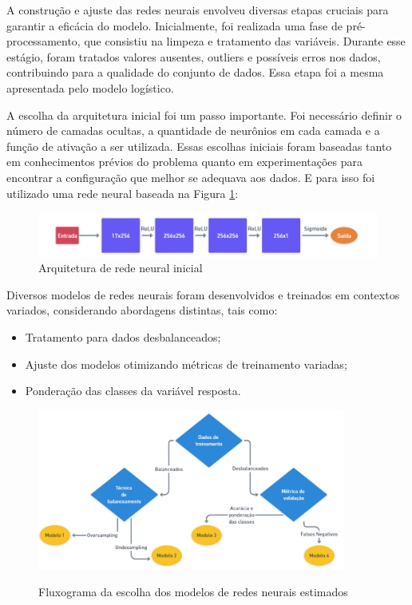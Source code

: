 A  construção e ajuste das redes neurais envolveu diversas etapas cruciais 
para garantir a eficácia do modelo. Inicialmente, foi realizada uma fase de pré-processamento, que consistiu
na limpeza e tratamento das variáveis. Durante esse estágio, foram tratados valores ausentes, outliers e possíveis
erros nos dados, contribuindo para a qualidade do conjunto de dados. Essa etapa foi a mesma apresentada pelo
modelo logístico.

A escolha da arquitetura inicial foi um passo importante. Foi necessário definir o número de camadas ocultas,
a quantidade de neurônios em cada camada e a função de ativação a ser utilizada. Essas escolhas iniciais foram 
baseadas tanto em conhecimentos prévios do problema quanto em experimentações para encontrar a configuração que 
melhor se adequava aos dados. 
E para isso foi utilizado uma rede neural baseada na Figura \ref{fig:imagens/arc_rede_neural.png}:

\begin{figure}[H]
  \centering
  \includegraphics[width=1\textwidth]{imagens/arc_rede_neural.png}
  \caption{Arquitetura de rede neural inicial}
  \label{fig:imagens/arc_rede_neural.png}
\end{figure}


Diversos modelos de redes neurais foram desenvolvidos e treinados em contextos variados,
 considerando abordagens distintas, tais como:

\begin{itemize}
  \item Tratamento para dados desbalanceados;
  \item Ajuste dos modelos otimizando métricas de treinamento variadas;
  \item Ponderação das classes da variável resposta.
\end{itemize}

\begin{figure}[H]
  \caption{Fluxograma da escolha dos modelos de redes neurais estimados}
  \centering
  \includegraphics[width=0.9\textwidth]{imagens/fluxograma_selecao_modelo_neural.png}
  \label{fig:imagens/fluxograma_selecao_modelo_neural.png}
\end{figure}



